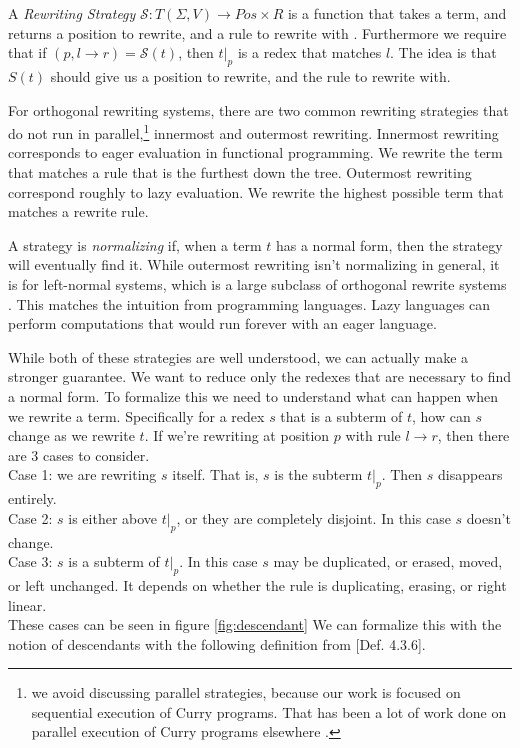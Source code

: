 \documentclass{book}
\theoremstyle{definition}
\begin{document}
A \emph{Rewriting Strategy} $\mathcal{S} : T(\Sigma, V) \to Pos\times R$ 
is a function that takes a term, and returns a position to rewrite, and a rule to rewrite with
\cite{termRewriting}.
Furthermore we require that if $(p,l \to r) = \mathcal{S}(t)$, then $t\vert_p$ is a redex that matches $l$.
The idea is that $S(t)$ should give us a position to rewrite, and the rule to rewrite with.

For orthogonal rewriting systems, 
there are two common rewriting strategies that do not run in 
parallel,\footnote{we avoid discussing parallel strategies,
                   because our work is focused on sequential execution of Curry programs.
                   That has been a lot of work done on parallel execution of Curry programs 
                   elsewhere \cite{concurrentCurry,abstractConcurrentCurry}.}
innermost and outermost rewriting\cite{termRewriting,rewriteStrategies}.
Innermost rewriting corresponds to eager evaluation in functional programming.
We rewrite the term that matches a rule that is the furthest down the tree.
Outermost rewriting correspond roughly to lazy evaluation.
We rewrite the highest possible term that matches a rewrite rule.

A strategy is \emph{normalizing} if, when a term $t$ has a normal form, 
then the strategy will eventually find it.
While outermost rewriting isn't normalizing in general,
it is for left-normal systems, 
which is a large subclass of orthogonal rewrite systems \cite{termRewriting}.
This matches the intuition from programming languages.
Lazy languages can perform computations that would run forever with an eager language.

While both of these strategies are well understood, we can actually make a stronger guarantee.
We want to reduce only the redexes that are necessary to find a normal form.
To formalize this we need to understand what can happen when we rewrite a term.
Specifically for a redex $s$ that is a subterm of $t$, how can $s$ change as we rewrite $t$.
If we're rewriting at position $p$ with rule $l \to r$, then there are 3 cases to consider.\\
Case 1: we are rewriting $s$ itself.  That is, $s$ is the subterm $t\vert_p$.
Then $s$ disappears entirely.\\
Case 2: $s$ is either above $t\vert_p$, or they are completely disjoint.
In this case $s$ doesn't change.\\
Case 3: $s$ is a subterm of $t\vert_p$.
In this case $s$ may be duplicated, or erased, moved, or left unchanged.
It depends on whether the rule is duplicating, erasing, or right linear.\\
These cases can be seen in figure \ref{fig:descendant}
We can formalize this with the notion of descendants with the following definition from 
\cite{AdvancedTRS}[Def. 4.3.6].
\end{document}

